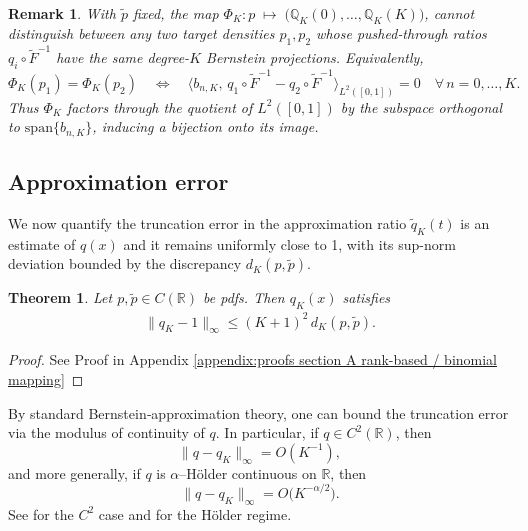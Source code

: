 \documentclass{article}
\newtheorem{theorem}{Theorem}[section]
\newtheorem{remark}{Remark}[section]
\begin{document}
\begin{remark}
With \(\tilde p\) fixed, the map $\Phi_K: p \;\longmapsto\; \bigl(\mathbb Q_K(0),\dots,\mathbb Q_K(K)\bigr)$, cannot distinguish between any two target densities \(p_1, p_2\) whose pushed‐through ratios \(q_i\circ\tilde F^{-1}\) have the same degree-\(K\) Bernstein projections.  Equivalently,
\[
\Phi_K(p_1)=\Phi_K(p_2)
\quad\Longleftrightarrow\quad
\bigl\langle b_{n,K},\,q_1\circ\tilde F^{-1}-q_2\circ\tilde F^{-1}\bigr\rangle_{L^2([0,1])}
=0
\quad\forall\,n=0,\dots,K.
\]
Thus \(\Phi_K\) factors through the quotient of \(L^2([0,1])\) by the subspace orthogonal to \(\mathrm{span}\{b_{n,K}\}\), inducing a bijection onto its image.
\end{remark}

\subsection{Approximation error}


We now quantify the truncation error in the approximation ratio $\tilde{q}_{K}(t)$ is an estimate of $q(x)$ and it remains uniformly close to 1, with its sup-norm deviation bounded by the discrepancy \(d_K(p,\tilde p)\).  

\begin{theorem}\label{lemma: uniform boudn for q_K convergence to 1}
Let $p,\tilde{p}\in C(\mathbb{R})$ be pdfs. Then $q_K(x)$ satisfies
\begin{align*}
\|q_K - 1\|_{\infty} \leq (K+1)^{2}\, d_K(p,\tilde{p}).
\end{align*}
\end{theorem}
\begin{proof}
    See Proof in Appendix \ref{appendix:proofs section A rank-based / binomial mapping}
\end{proof}


By standard Bernstein‐approximation theory, one can bound the truncation error via the modulus of continuity of \(q\).  In particular, if \(q\in C^2(\mathbb{R})\), then 
\[
\|q - q_K\|_{\infty} = O(K^{-1}),
\]
and more generally, if \(q\) is \(\alpha\)–Hölder continuous on \(\mathbb{R}\), then
\[
\|q - q_K\|_{\infty} = O\bigl(K^{-\alpha/2}\bigr).
\]
See \cite{gzyl1997weierstrass} for the \(C^2\) case and \cite{mathe1999approximation} for the Hölder regime.
\end{document}
